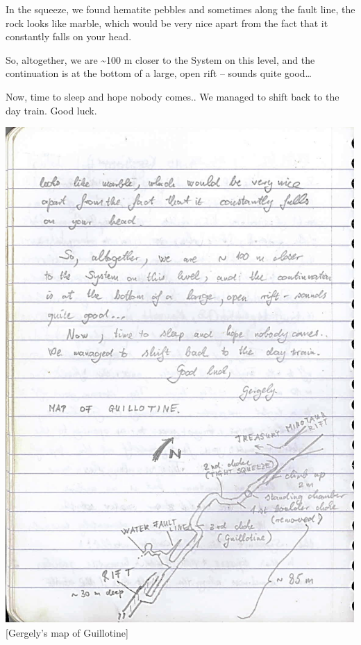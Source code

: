 In the squeeze, we found hematite pebbles and sometimes along the fault
line, the rock looks like marble, which would be very nice apart from
the fact that it constantly falls on your head.

So, altogether, we are \textasciitilde 100 m closer to the System on
this level, and the continuation is at the bottom of a large, open rift
-- sounds quite good\ldots{}

Now, time to sleep and hope nobody comes.. We managed to shift back to
the day train. Good luck.

\includegraphics{UgLog1012/79.jpeg}\\
{[}Gergely's map of Guillotine{]}

